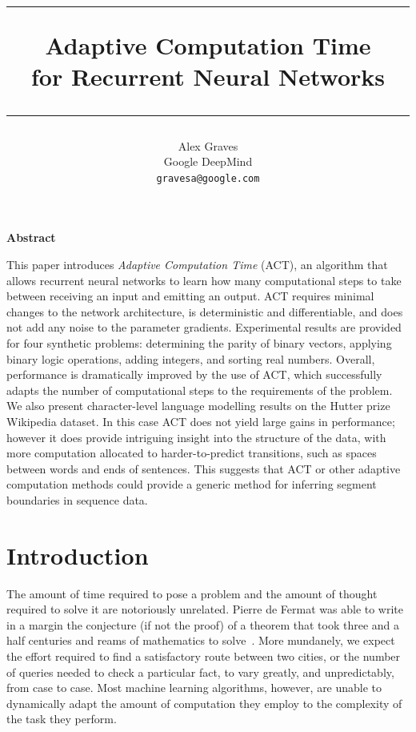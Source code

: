 \documentclass[10pt]{article}
\author{Alex Graves\\
Google DeepMind\\
\texttt{gravesa@google.com}
}
\date{}
\title{
\rule[0.4cm]{\textwidth}{2pt}
{\bf Adaptive Computation Time\\for Recurrent Neural Networks}
\rule{\textwidth}{2pt} 
}
\begin{document}
\maketitle

\begin{center}
{\bf Abstract} 
\end{center}
This paper introduces \emph{Adaptive Computation Time} (ACT), an algorithm that allows recurrent neural networks to learn how many computational steps to take between receiving an input and emitting an output.
ACT requires minimal changes to the network architecture, is deterministic and differentiable, and does not add any noise to the parameter gradients.
Experimental results are provided for four synthetic problems: determining the parity of binary vectors, applying binary logic operations, adding integers, and sorting real numbers.
Overall, performance is dramatically improved by the use of ACT, which successfully adapts the number of computational steps to the requirements of the problem.
We also present character-level language modelling results on the Hutter prize Wikipedia dataset.
In this case ACT does not yield large gains in performance; however it does provide intriguing insight into the structure of the data, with more computation allocated to harder-to-predict transitions, such as spaces between words and ends of sentences.
This suggests that ACT or other adaptive computation methods could provide a generic method for inferring segment boundaries in sequence data.

\section{Introduction}
The amount of time required to pose a problem and the amount of thought required to solve it are notoriously unrelated.
Pierre de Fermat was able to write in a margin the conjecture (if not the proof) of a theorem that took three and a half centuries and reams of mathematics to solve~\cite{wiles95fermat}.
More mundanely, we expect the effort required to find a satisfactory route between two cities, or the number of queries needed to check a particular fact, to vary greatly, and unpredictably, from case to case.
Most machine learning algorithms, however, are unable to dynamically adapt the amount of computation they employ to the complexity of the task they perform.
\end{document}
